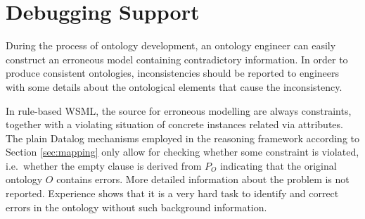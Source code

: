 \def\transdebug{\transtxt{debug}}
\def\pvotype{\predicate{\predsubtxt{v\_otype}}}
\def\pvmincard{\predicate{\predsubtxt{v\_mincard}}}
\def\pvmaxcard{\predicate{\predsubtxt{v\_maxcard}}}
\def\pvuser{\predicate{\predsubtxt{v\_user}}}
\def\axiomid{\ensuremath{Ax_{I\!D}}\xspace}
\def\debugaxioms{\ensuremath{P_{\smtxtit{debug}}}\xspace}

\section{Debugging Support\label{sec:debugging}}

During the process of ontology development, an ontology engineer
can easily construct an erroneous model containing contradictory
information. In order to produce consistent ontologies,
inconsistencies should be reported to engineers with some details
about the ontological elements that cause the inconsistency.

In rule-based WSML, the source for erroneous modelling are always
constraints, together with a violating situation of concrete
instances related via attributes. The plain Datalog mechanisms
employed in the reasoning framework according to Section
\ref{sec:mapping} only allow for checking whether some constraint
is violated, i.e.\ whether the empty clause is derived from $P_O$
indicating that the original ontology $O$ contains errors. More
detailed information about the problem is not reported. Experience
shows that it is a very hard task to identify and correct errors
in the ontology without such background information.

